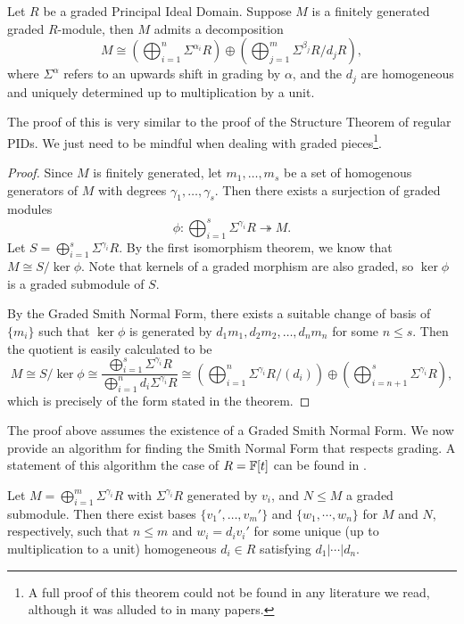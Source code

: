 \begin{theorem}\label{thm:GradedStructure}
Let \(R\) be a graded Principal Ideal Domain. Suppose \(M\) is a finitely generated graded \(R\)-module, then \(M\) admits a decomposition
\[M \cong \left(\bigoplus_{i=1}^{n}\Sigma^{\alpha_i} R \right)\oplus \left(\bigoplus_{j=1}^{m} \Sigma^{\beta_j}R/d_j R\right),\]
where \(\Sigma^{\alpha}\) refers to an upwards shift in grading by \(\alpha\), and the $d_j$ are homogeneous and uniquely determined up to multiplication by a unit.
\end{theorem}

The proof of this is very similar to the proof of the Structure Theorem of regular PIDs. We just need to be mindful when dealing with graded pieces\footnote{A full proof of this theorem could not be found in any literature we read, although it was alluded to in many papers.}. 

\begin{proof}
    Since \(M\) is finitely generated, let \(m_1,\dots,m_s\) be a set of homogenous generators of \(M\) with degrees \(\gamma_1,\dots,\gamma_s\). Then there exists a surjection of graded modules
    \[\phi:\bigoplus_{i=1}^{s}\Sigma^{\gamma_i} R \twoheadrightarrow M.\]
    Let \(S=\bigoplus_{i=1}^{s}\Sigma^{\gamma_i} R\). By the first isomorphism theorem, we know that \(M\cong S/\ker \phi\). Note that kernels of a graded morphism are also graded, so \(\ker\phi\) is a graded submodule of \(S\).

    By the Graded Smith Normal Form, there exists a suitable change of basis of \(\{m_i\}\) such that \(\ker\phi\) is generated by \(d_1m_1,d_2m_2,\dots, d_nm_n\) for some \(n\leq s\). Then the quotient is easily calculated to be
    \[M\cong S/\ker\phi \cong \frac{\displaystyle\bigoplus_{i=1}^{s}\Sigma^{\gamma_i} R}{\displaystyle\bigoplus_{i=1}^{n}d_i\Sigma^{\gamma_i} R} \cong \left(\bigoplus_{i=1}^{n}\Sigma^{\gamma_i} R/(d_i)\right) \oplus\left(\bigoplus_{i=n+1}^{s}\Sigma^{\gamma_i} R\right),\]
    which is precisely of the form stated in the theorem.
\end{proof}

The proof above assumes the existence of a Graded Smith Normal Form. We now provide an algorithm for finding the Smith Normal Form that respects grading. A statement of this algorithm the case of \(R=\mathbb{F}[t]\) can be found in \cite{Skraba2013PersistenceMA}.

\begin{lemma}\label{thm:GradedSmith}
    Let $M=\bigoplus_{i=1}^{m} \Sigma^{\gamma_i} R$ with $\Sigma^{\gamma_i} R$ generated by $v_i$, and $N \leq M$ a graded submodule. Then there exist bases $\{v_1',\dots,v_m'\}$ and $\{w_1,\cdots, w_n\}$ for \(M\) and \(N\), respectively, such that \(n\leq m\) and \(w_i=d_iv_i'\) for some unique (up to multiplication to a unit) homogeneous \(d_i\in R\) satisfying \(d_1|\cdots |d_n\).
\end{lemma}

